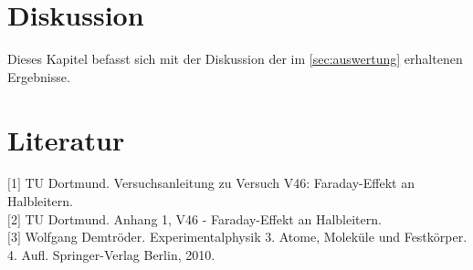 

\section{Diskussion}
\label{sec:Diskussion}

Dieses Kapitel befasst sich mit der Diskussion der im \autoref{sec:auswertung} erhaltenen Ergebnisse.


\section{Literatur}
\label{sec:literatur}
$[$1$]$ TU Dortmund. Versuchsanleitung zu Versuch V46: Faraday-Effekt an Halbleitern.\\
$[$2$]$ TU Dortmund. Anhang 1, V46 - Faraday-Effekt an Halbleitern.\\
$[$3$]$ Wolfgang Demtröder. Experimentalphysik 3. Atome, Moleküle und Festkörper. 4. Aufl. Springer-Verlag Berlin, 2010.\\
